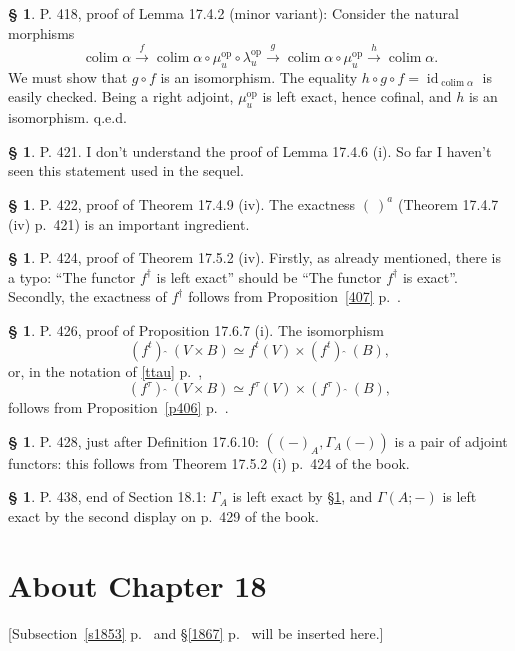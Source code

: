 \documentclass[12pt]{article}
\theoremstyle{remark}
\theoremstyle{definition}
\newtheorem{s}[thm]{\S}
\newcommand{\mv}{ (minor variant)}
\newcommand{\xr}{\xrightarrow}
\DeclareMathOperator*{\co}{colim}
\DeclareMathOperator{\id}{id}
\DeclareMathOperator{\op}{op}
\begin{document}
%
%
\begin{s} 
P. 418, proof of Lemma 17.4.2\mv: Consider the natural morphisms 
$$
\co\alpha\xr f\co\alpha\circ\mu_u^{\op}\circ\lambda_u^{\op}\xr g\co\alpha\circ\mu_u^{\op}\xr h\co\alpha.
$$
We must show that $g\circ f$ is an isomorphism. The equality $h\circ g\circ f=\id_{\co\alpha}$ is easily checked. Being a right adjoint, $\mu_u^{\op}$ is left exact, hence cofinal, and $h$ is an isomorphism. q.e.d.
\end{s}
%
%
\begin{s} 
P. 421. I don't understand the proof of Lemma 17.4.6 (i). So far I haven't seen this statement used in the sequel.
\end{s}
%
%
\begin{s} 
P. 422, proof of Theorem 17.4.9 (iv). The exactness $(\ )^a$ (Theorem 17.4.7 (iv) p.~421) is an important ingredient.
\end{s}
%
%
\begin{s} 
P. 424, proof of Theorem 17.5.2 (iv). Firstly, as already mentioned, there is a typo: ``The functor $f^\dagger$ is left exact'' should be ``The functor $f^\dagger$ is exact''. Secondly, the exactness of $f^\dagger$ follows from Proposition~\ref{407} p.~\pageref{407}.
\end{s}
%
%
\begin{s} 
P. 426, proof of Proposition 17.6.7 (i). The isomorphism 
$$
(f^t)\ \widehat{}\ (V\times B)\simeq f^t(V)\times(f^t)\ \widehat{}\ (B),
$$ 
or, in the notation of \eqref{ttau} p.~\pageref{ttau}, 
$$
(f^\tau)\ \widehat{}\ (V\times B)\simeq f^\tau(V)\times(f^\tau)\ \widehat{}\ (B),
$$
follows from Proposition~\ref{p406} p.~\pageref{p406}.
\end{s}
%
%
\begin{s}\label{a428}
P. 428, just after Definition 17.6.10: $((-)_A,\Gamma_A(-))$ is a pair of adjoint functors: this follows from Theorem 17.5.2 (i) p.~424 of the book.
\end{s}
%
%
\begin{s}\label{a438}
P. 438, end of Section 18.1: $\Gamma_A$ is left exact by \S\ref{a428}, and $\Gamma(A;-)$ is left exact by the second display on p.~429 of the book.
\end{s}
%
\section{About Chapter 18}
%
[Subsection~\ref{s1853} p.~\pageref{s1853} and \S\ref{1867} p.~\pageref{1867} will be inserted here.]
%
%
%
\newpage
\end{document}
